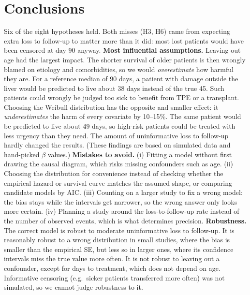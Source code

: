 \documentclass[10pt,a4paper]{article}
\begin{document}
\section{Conclusions}
Six of the eight hypotheses held. Both misses (H3, H6) came from expecting extra loss to follow-up to matter more than it did: most lost patients would have been censored at day 90 anyway.
\textbf{Most influential assumptions.} Leaving out age had the largest impact. The shorter survival of older patients is then wrongly blamed on etiology and comorbidities, so we would \emph{overestimate} how harmful they are. For a reference median of 90 days, a patient with damage outside the liver would be predicted to live about 38 days instead of the true 45. Such patients could wrongly be judged too sick to benefit from TPE or a transplant. Choosing the Weibull distribution has the opposite and smaller effect: it \emph{underestimates} the harm of every covariate by 10--15\%. The same patient would be predicted to live about 49 days, so high-risk patients could be treated with less urgency than they need. The amount of uninformative loss to follow-up hardly changed the results. (These findings are based on simulated data and hand-picked $\beta$ values.)
\textbf{Mistakes to avoid.} (i) Fitting a model without first drawing the causal diagram, which risks missing confounders such as age. (ii) Choosing the distribution for convenience instead of checking whether the empirical hazard or survival curve matches the assumed shape, or comparing candidate models by AIC. (iii) Counting on a larger study to fix a wrong model: the bias stays while the intervals get narrower, so the wrong answer only looks more certain. (iv) Planning a study around the loss-to-follow-up rate instead of the number of observed events, which is what determines precision.
\textbf{Robustness.} The correct model is robust to moderate uninformative loss to follow-up. It is reasonably robust to a wrong distribution in small studies, where the bias is smaller than the empirical SE, but less so in larger ones, where its confidence intervals miss the true value more often. It is not robust to leaving out a confounder, except for days to treatment, which does not depend on age. Informative censoring (e.g.\ sicker patients transferred more often) was not simulated, so we cannot judge robustness to it.
\end{document}
